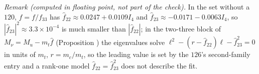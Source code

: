 \emph{Remark (computed in floating point, not part of the check).} In the set without a $120$, $\hat{f} = f/f_{33}$ has $\hat{f}_{22} \approx 0.0247 + 0.0109I_{4}$ and $\hat{f}_{23} \approx -0.0171 - 0.0063I_{4}$, so $|\hat{f}_{23}|^{2} \approx 3.3 \times 10^{-4}$ is much smaller than $|\hat{f}_{22}|$; in the two-three block of $M_{\nu} = M_{u} - m_{t}\hat{f}$ (Proposition ) the eigenvalues solve $\ell^{2} - (r - \hat{f}_{22})\ell - \hat{f}_{23}^{2} = 0$ in units of $m_{t}$, $r = m_{c}/m_{t}$, so the leading value is set by the $126$'s second-family entry and a rank-one model $\hat{f}_{22} = \hat{f}_{23}^{2}$ does not describe the fit.
